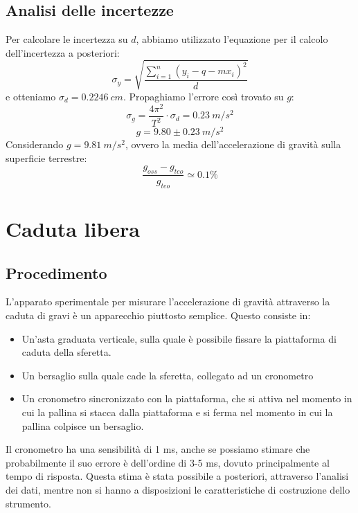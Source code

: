 \subsection{Analisi delle incertezze}

Per calcolare le incertezza su $d$, abbiamo utilizzato l'equazione per il calcolo dell'incertezza a posteriori:
\begin{equation}
\sigma_y = \displaystyle\sqrt{\frac{\displaystyle\sum^n_{i=1}\left(y_i-q-mx_i \right)^2}{d}}
\end{equation}
e otteniamo $\sigma_d = 0.2246\ cm$. 
Propaghiamo l'errore così trovato su $g$:
$$\sigma_g = \frac{4 \pi^2}{T^2} \cdot \sigma_d = 0.23 \ m/s^2$$
$$ g = 9.80 \pm 0.23 \ m/s^2 $$
Considerando $g=9.81\ m/s^2$, ovvero la media dell'accelerazione di gravità sulla superficie terrestre:
$$\frac{g_{oss} - g_{teo}}{g_{teo}} \simeq 0.1\% $$



\section{Caduta libera}
\subsection{Procedimento}
L'apparato sperimentale per misurare l'accelerazione di gravità attraverso la caduta di gravi è un apparecchio piuttosto semplice. Questo consiste in:
\begin{itemize}
 \item Un'asta graduata verticale, sulla quale è possibile fissare la piattaforma di caduta della sferetta.
 \item Un bersaglio sulla quale cade la sferetta, collegato ad un cronometro
 \item Un cronometro sincronizzato con la piattaforma, che si attiva nel momento in cui la pallina si stacca dalla piattaforma e si ferma nel momento in cui la pallina colpisce un bersaglio.
\end{itemize}

Il cronometro ha una sensibilità di 1 ms, anche se possiamo stimare che probabilmente il suo errore è dell'ordine di 3-5 ms, dovuto principalmente al tempo di risposta. Questa stima è stata possibile a posteriori, attraverso l'analisi dei dati, mentre non si hanno a disposizioni le caratteristiche di costruzione dello strumento.

